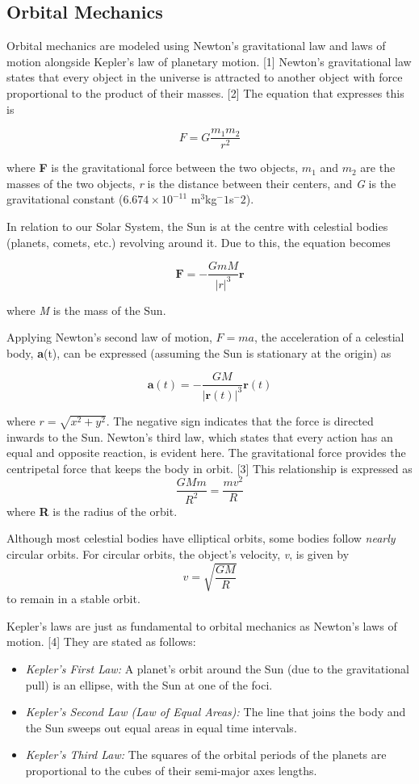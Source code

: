 \documentclass[11 pt, a4paper, twocolumn]{article}
\begin{document}
\subsection{Orbital Mechanics}
Orbital mechanics are modeled using Newton's gravitational law and laws of motion alongside Kepler's 
law of planetary motion. [1] Newton's gravitational law states that every object in the universe is
attracted to another object with force proportional to the product of their masses. [2] The equation 
that expresses this is

\[
F = G \frac{m_1m_2}{r^2}
\tag{Eq. 1a}
\]

where \textbf{F} is the gravitational force between the two objects, $m_1$ and $m_2$ are the masses 
of the two objects, \textit{r} is the distance between their centers, and \textit{G} is the 
gravitational constant ($6.674 \times 10^{-11}$ m$^3$kg$^-1$s$^-2$). 

In relation to our Solar System, the Sun is at the centre with celestial bodies (planets, comets, etc.)
revolving around it. Due to this, the equation becomes

\[
\mathbf{F} = -\frac{GmM}{|r|^3}\mathbf{r}
\tag{Eq. 1b}
\]

where \textit{M} is the mass of the Sun.

Applying Newton's second law of motion, $F=ma$, the acceleration of a celestial body, \textbf{a}(t),
can be expressed (assuming the Sun is stationary at the origin) as

\[
\mathbf{a}(t) = -\frac{GM}{|\mathbf{r}(t)|^3}\mathbf{r}(t)
\tag{Eq. 2}
\]

where $r = \sqrt{x^2 +y^2}$.
The negative sign indicates that the force is directed inwards to the Sun. Newton's third law, 
which states that every action has an equal and opposite reaction, is evident here. The gravitational 
force provides the centripetal force that keeps the body in orbit. [3] This relationship is expressed as
\[
\frac{GMm}{R^2} = \frac{mv^2}{R}
\tag{Eq. 3}
\]
where \textbf{R} is the radius of the orbit.

Although most celestial bodies have elliptical orbits, some bodies follow \textit{nearly} circular 
orbits. For circular orbits, the object's velocity, \textit{v}, is given by
\[
v = \sqrt{\frac{GM}{R}}
\tag{Eq. 4}
\]
to remain in a stable orbit.

Kepler's laws are just as fundamental to orbital mechanics as Newton's laws of motion. [4] They are 
stated as follows:
\begin{itemize}
    \item \textit{Kepler's First Law:} A planet's orbit around the Sun (due to the gravitational pull) 
    is an ellipse, with the Sun at one of the foci.
    \item \textit{Kepler's Second Law (Law of Equal Areas):} The line that joins the body and the Sun 
    sweeps out equal areas in equal time intervals.
    \item \textit{Kepler's Third Law:} The squares of the orbital periods of the planets are proportional
     to the cubes of their semi-major axes lengths.
\end{itemize}
\end{document}

